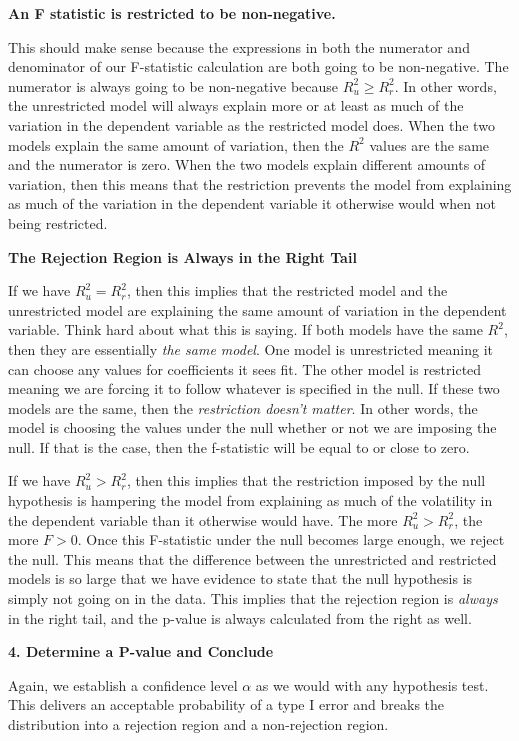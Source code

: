 \documentclass[
]{book}
\begin{document}
\textbf{An F statistic is restricted to be non-negative.}

This should make sense because the expressions in both the numerator and denominator of our F-statistic calculation are both going to be non-negative. The numerator is always going to be non-negative because \(R^2_u \geq R^2_r\). In other words, the unrestricted model will always explain more or at least as much of the variation in the dependent variable as the restricted model does. When the two models explain the same amount of variation, then the \(R^2\) values are the same and the numerator is zero. When the two models explain different amounts of variation, then this means that the restriction prevents the model from explaining as much of the variation in the dependent variable it otherwise would when not being restricted.

\textbf{The Rejection Region is Always in the Right Tail}

If we have \(R^2_u = R^2_r\), then this implies that the restricted model and the unrestricted model are explaining the same amount of variation in the dependent variable. Think hard about what this is saying. If both models have the same \(R^2\), then they are essentially \emph{the same model}. One model is unrestricted meaning it can choose any values for coefficients it sees fit. The other model is restricted meaning we are forcing it to follow whatever is specified in the null. If these two models are the same, then the \emph{restriction doesn't matter}. In other words, the model is choosing the values under the null whether or not we are imposing the null. If that is the case, then the f-statistic will be equal to or close to zero.

If we have \(R^2_u > R^2_r\), then this implies that the restriction imposed by the null hypothesis is hampering the model from explaining as much of the volatility in the dependent variable than it otherwise would have. The more \(R^2_u > R^2_r\), the more \(F>0\). Once this F-statistic under the null becomes large enough, we reject the null. This means that the difference between the unrestricted and restricted models is so large that we have evidence to state that the null hypothesis is simply not going on in the data. This implies that the rejection region is \emph{always} in the right tail, and the p-value is always calculated from the right as well.

\textbf{4. Determine a P-value and Conclude}

Again, we establish a confidence level \(\alpha\) as we would with any hypothesis test. This delivers an acceptable probability of a type I error and breaks the distribution into a rejection region and a non-rejection region.
\end{document}
